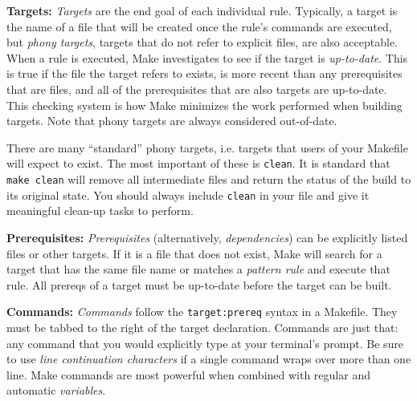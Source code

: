 \documentclass[12pt, letterpaper]{article}
\begin{document}
\noindent \textbf{Targets:} \emph{Targets} are the end goal of each
individual rule.  Typically, a target is the name of a file that will be 
created once the rule's commands are executed, but \emph{phony targets}, 
targets that do not refer to explicit files, are also acceptable.  When
a rule is executed, Make investigates to see if the target is \emph{up-to-date}.
This is true if the file the target refers to exists, is more recent than
any prerequisites that are files, and all of the prerequisites that are also
targets are up-to-date.  This checking system is how Make minimizes the 
work performed when building targets.  Note that phony targets are
always considered out-of-date.

There are many ``standard'' phony targets, i.e. targets that users of
your Makefile will expect to exist.  The most important of these is {\tt clean}.
It is standard that {\tt make clean} will remove all intermediate files and
return the status of the build to its original state.  You should always
include {\tt clean} in your file and give it meaningful clean-up tasks to
perform.

\vspace{0.5cm}

\noindent \textbf{Prerequisites:} \emph{Prerequisites} (alternatively, 
\emph{dependencies}) can be explicitly listed files or other targets.  If it
is a file that does not exist, Make will search for a target that has the
same file name or matches a \emph{pattern rule} and execute that rule.  All
prereqs of a target must be up-to-date before the target can be built.

\vspace{0.5cm}

\noindent \textbf{Commands:} \emph{Commands} follow the {\tt target:prereq}
syntax in a Makefile.  They must be tabbed to the right of the target
declaration.  Commands are just that: any command that you would
explicitly type at your terminal's prompt.  Be sure to use 
\emph{line continuation characters} if a single command wraps over more than
one line.  Make commands are most powerful when combined with regular and
automatic \emph{variables}.

\vspace{0.5cm}
\end{document}
